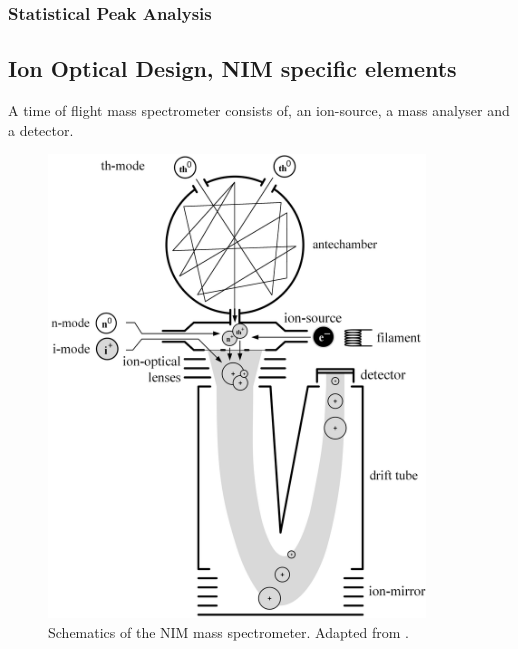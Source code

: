 	
	\subsubsection{Statistical Peak Analysis}
	

	
	\subsection{Ion Optical Design, NIM specific elements} %
	
	A time of flight mass spectrometer consists of, an ion-source, a mass analyser and a detector.\\
	
	\begin{figure}[htb] %
		\centering
		\includegraphics[width= 10cm]{Bilder/NIM_Sketch.png} %
		\caption{Schematics of the NIM mass spectrometer. Adapted from \cite{Diss_Meyer}.}
		\label{fig:NIMSketch}
	\end{figure}

